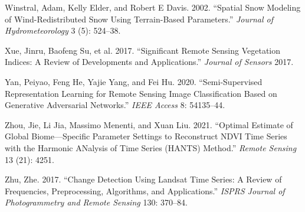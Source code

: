 \documentclass[
  letterpaper,
  DIV=11,
  numbers=noendperiod]{scrreprt}
\newlength{\cslhangindent}
\newlength{\cslentryspacingunit} %
\newenvironment{CSLReferences}[2] %
 {%
  \setlength{\parindent}{0pt}
  \ifodd #1
  \let\oldpar\par
  \def\par{\hangindent=\cslhangindent\oldpar}
  \fi
  \setlength{\parskip}{#2\cslentryspacingunit}
 }%
 {}
\begin{document}
\begin{CSLReferences}{1}{0}
\leavevmode{}%
Winstral, Adam, Kelly Elder, and Robert E Davis. 2002. {``Spatial Snow
Modeling of Wind-Redistributed Snow Using Terrain-Based Parameters.''}
\emph{Journal of Hydrometeorology} 3 (5): 524--38.

\leavevmode{}%
Xue, Jinru, Baofeng Su, et al. 2017. {``Significant Remote Sensing
Vegetation Indices: A Review of Developments and Applications.''}
\emph{Journal of Sensors} 2017.

\leavevmode{}%
Yan, Peiyao, Feng He, Yajie Yang, and Fei Hu. 2020. {``Semi-Supervised
Representation Learning for Remote Sensing Image Classification Based on
Generative Adversarial Networks.''} \emph{IEEE Access} 8: 54135--44.

\leavevmode{}%
Zhou, Jie, Li Jia, Massimo Menenti, and Xuan Liu. 2021. {``Optimal
Estimate of Global Biome---Specific Parameter Settings to Reconstruct
NDVI Time Series with the Harmonic ANalysis of Time Series (HANTS)
Method.''} \emph{Remote Sensing} 13 (21): 4251.

\leavevmode{}%
Zhu, Zhe. 2017. {``Change Detection Using Landsat Time Series: A Review
of Frequencies, Preprocessing, Algorithms, and Applications.''}
\emph{ISPRS Journal of Photogrammetry and Remote Sensing} 130: 370--84.

\end{CSLReferences}
\end{document}
